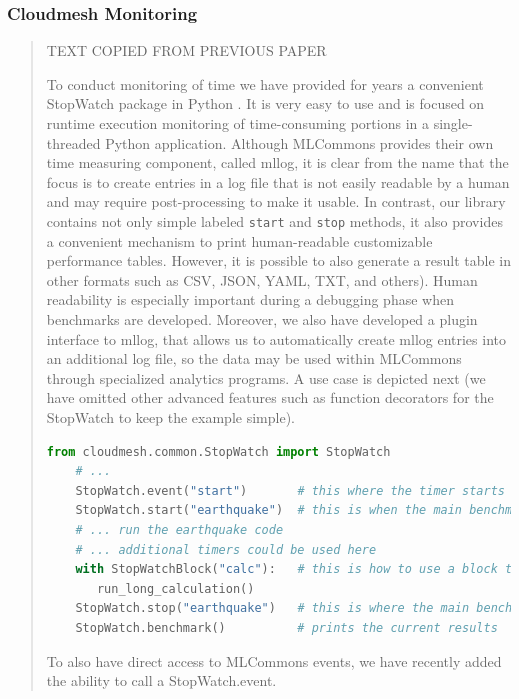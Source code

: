 \documentclass[utf8]{FrontiersinVancouver} %
\begin{document}
\subsubsection{Cloudmesh Monitoring}
\label{sec:monitoring}

\begin{quote}

TEXT COPIED FROM PREVIOUS PAPER

To conduct monitoring of time we have provided for years a convenient StopWatch package in Python \citep{cloudmesh-stopwatch}.  It is very easy to use and is focused on runtime execution monitoring of time-consuming portions in a single-threaded Python application. Although MLCommons provides their own time measuring component, called mllog, it is clear from the name that the focus is to create entries in a log file that is not easily readable by a human and may require post-processing to make it usable. In contrast, our library contains not only simple labeled \texttt{start} and \texttt{stop} methods, it also provides a convenient mechanism to print human-readable customizable performance tables. However, it is possible to also generate a result table in other formats such as CSV, JSON, YAML, TXT, and others).  Human readability is especially important during a debugging phase when benchmarks are developed. Moreover, we also have developed a plugin interface to mllog, that allows us to automatically create mllog entries into an additional log file, so the data may be used within MLCommons through specialized analytics programs. A use case is depicted next (we have omitted other advanced features such as function decorators for the StopWatch to keep the example simple).



\begin{lstlisting}[language=Python]
    from cloudmesh.common.StopWatch import StopWatch 
    # ...
    StopWatch.event("start")       # this where the timer starts
    StopWatch.start("earthquake")  # this is when the main benchmark starts
    # ... run the earthquake code
    # ... additional timers could be used here
    with StopWatchBlock("calc"):   # this is how to use a block timer
       run_long_calculation()
    StopWatch.stop("earthquake")   # this is where the main benchmark ends
    StopWatch.benchmark()          # prints the current results
\end{lstlisting}

To also have direct access to MLCommons events, we have recently added the ability to call a StopWatch.event.



\end{quote}
\end{document}
